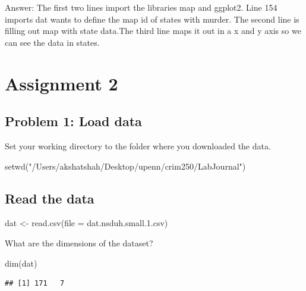 \documentclass[
]{article}
\newenvironment{Shaded}{\begin{snugshade}}{\end{snugshade}}
\newcommand{\AttributeTok}[1]{\textcolor[rgb]{0.77,0.63,0.00}{#1}}
\newcommand{\FunctionTok}[1]{\textcolor[rgb]{0.00,0.00,0.00}{#1}}
\newcommand{\NormalTok}[1]{#1}
\newcommand{\OtherTok}[1]{\textcolor[rgb]{0.56,0.35,0.01}{#1}}
\newcommand{\StringTok}[1]{\textcolor[rgb]{0.31,0.60,0.02}{#1}}
\begin{document}
Answer: The first two lines import the libraries map and ggplot2. Line
154 imports dat wants to define the map id of states with murder. The
second line is filling out map with state data.The third line maps it
out in a x and y axis so we can see the data in states.

\hypertarget{assignment-2}{%
\section{Assignment 2}\label{assignment-2}}

\hypertarget{problem-1-load-data}{%
\subsection{Problem 1: Load data}\label{problem-1-load-data}}

Set your working directory to the folder where you downloaded the data.

\begin{Shaded}
\begin{Highlighting}[]
\FunctionTok{setwd}\NormalTok{(}\StringTok{"/Users/akshatshah/Desktop/upenn/crim250/LabJournal"}\NormalTok{)}
\end{Highlighting}
\end{Shaded}

\hypertarget{read-the-data}{%
\subsection{Read the data}\label{read-the-data}}

\begin{Shaded}
\begin{Highlighting}[]
\NormalTok{dat }\OtherTok{\textless{}{-}} \FunctionTok{read.csv}\NormalTok{(}\AttributeTok{file =} \StringTok{\textquotesingle{}dat.nsduh.small.1.csv\textquotesingle{}}\NormalTok{)}
\end{Highlighting}
\end{Shaded}

What are the dimensions of the dataset?

\begin{Shaded}
\begin{Highlighting}[]
\FunctionTok{dim}\NormalTok{(dat)}
\end{Highlighting}
\end{Shaded}

\begin{verbatim}
## [1] 171   7
\end{verbatim}
\end{document}
